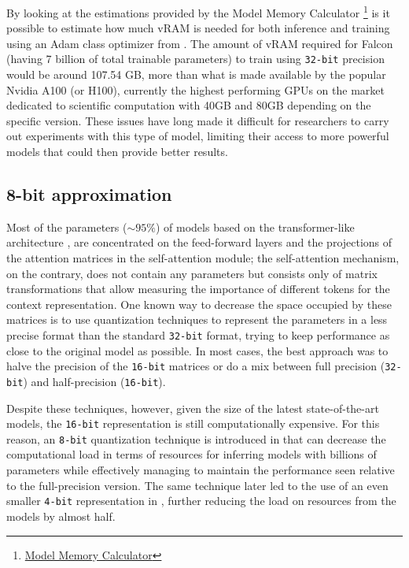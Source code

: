 By looking at the estimations provided by the Model Memory Calculator \footnote{\href{https://huggingface.co/spaces/hf-accelerate/model-memory-usage}{Model Memory Calculator}} is it possible to estimate how much vRAM is needed for both inference and training using an Adam class optimizer from \citet{Kingma2014AdamAM}. The amount of vRAM required for Falcon (having 7 billion of total trainable parameters) to train using \texttt{32-bit} precision would be around 107.54 GB, more than what is made available by the popular Nvidia A100 (or H100), currently the highest performing GPUs on the market dedicated to scientific computation with 40GB and 80GB depending on the specific version. These issues have long made it difficult for researchers to carry out experiments with this type of model, limiting their access to more powerful models that could then provide better results.


\subsection{8-bit approximation}

Most of the parameters ($\sim 95\%$) of models based on the transformer-like architecture \citep{DBLP:journals/corr/VaswaniSPUJGKP17},  are concentrated on the feed-forward layers and the projections of the attention matrices in the self-attention module; the self-attention mechanism, on the contrary, does not contain any parameters but consists only of matrix transformations that allow measuring the importance of different tokens for the context representation. One known way to decrease the space occupied by these matrices is to use quantization techniques to represent the parameters in a less precise format than the standard \texttt{32-bit} format, trying to keep performance as close to the original model as possible.
In most cases, the best approach was to halve the precision of the \texttt{16-bit} matrices or do a mix between full precision (\texttt{32-bit}) and half-precision (\texttt{16-bit}).

Despite these techniques, however, given the size of the latest state-of-the-art models, the \texttt{16-bit} representation is still computationally expensive. For this reason, an \texttt{8-bit} quantization technique is introduced in \citet{dettmers2022llmint8} that can decrease the computational load in terms of resources for inferring models with billions of parameters while effectively managing to maintain the performance seen relative to the full-precision version. The same technique later led to the use of an even smaller \texttt{4-bit} representation in \citet{dettmers2023case}, further reducing the load on resources from the models by almost half.

